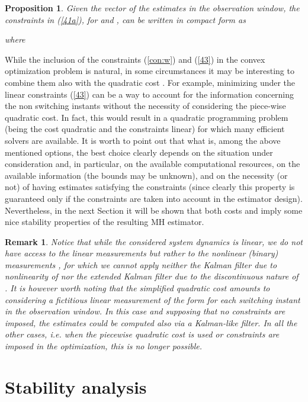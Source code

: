 \documentclass[11pt,journal,onecolumn]{IEEEtran}
\newtheorem{proposition}{Proposition}
\newtheorem{remark}{Remark}
\begin{document}
\begin{proposition}
Given the vector  of the estimates in the observation window,
the constraints in (\ref{41a}), for  and , can be written in compact form as

where

\end{proposition}\vspace{.3cm}

While the inclusion of the constraints (\ref{con:w}) and (\ref{43}) in the convex optimization problem  is natural, in some circumstances it may be interesting to combine them also with the quadratic cost . For example, minimizing  under the linear constraints (\ref{43}) can be a way to account for the information concerning the non switching instants without the necessity of considering the piece-wise quadratic cost. In fact, this would result in a quadratic programming problem (being the cost quadratic and the constraints linear) for which many efficient solvers are available. It is worth to point out that what is, among the above mentioned options, the best choice clearly depends on the situation under consideration and, in particular, on the available computational resources, on the available information (the bounds  may be unknown), and on the necessity (or not) of having estimates satisfying the constraints (since clearly this property is guaranteed only if the constraints are taken into account in the estimator design). Nevertheless, in the next Section it will be shown that both costs  and  imply some nice stability properties of the resulting MH estimator.

\begin{remark}
Notice that while the considered system dynamics is linear, we do not have access to the linear measurements  but rather to the nonlinear (binary) measurements  , for which we cannot apply neither the Kalman filter due to nonlinearity of  nor the extended Kalman filter due to the discontinuous nature of . It is however worth noting that the simplified quadratic cost  amounts to considering  a {\em fictitious} linear measurement of the form  for each switching instant  in the observation window. In this case and supposing that no constraints are imposed, the estimates could be computed also via a Kalman-like filter. In all the other cases, i.e. when the piecewise quadratic cost  is used or constraints are imposed in the optimization, this is no longer possible.
\end{remark}

\section{Stability analysis}
\end{document}
